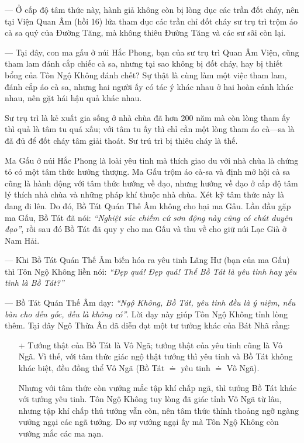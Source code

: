 --- Ở cấp độ tâm thức này, hành giả không còn bị lòng dục các trần đốt cháy, nên tại Viện Quan Âm (hồi 16) lửa tham dục các trần chỉ đốt cháy sư trụ trì trộm áo cà sa quý của Đường Tăng, mà không thiêu Đường Tăng và các sư sãi còn lại.

--- Tại đây, con ma gấu ở núi Hắc Phong, bạn của sư trụ trì Quan Âm Viện, cũng tham lam đánh cắp chiếc cà sa, nhưng tại sao không bị đốt cháy, hay bị thiết bổng của Tôn Ngộ Không đánh chết? Sự thật là cùng làm một việc tham lam, đánh cắp áo cà sa, nhưng hai người ấy có tác ý khác nhau ở hai hoàn cảnh khác nhau, nên gặt hái hậu quả khác nhau.

Sư trụ trì là kẻ xuất gia sống ở nhà chùa đã hơn 200 năm mà còn lòng tham ấy thì quả là tâm tu quá xấu; với tâm tu ấy thì chỉ cần một lòng tham áo cà---sa là đã đủ để đốt cháy tâm giải thoát. Sư trú trì bị thiêu cháy là thế.

Ma Gấu ở núi Hắc Phong là loài yêu tinh mà thích giao du với nhà chùa là chứng tỏ có một tâm thức hướng thượng. Ma Gấu trộm áo cà-sa và định mở hội cà sa cũng là hành động với tâm thức hướng về đạo, nhưng hướng về đạo ở cấp độ tâm lý thích nhà chùa và những pháp khí thuộc nhà chùa. Xét kỹ tâm thức này là đang đi lên. Do đó, Bồ Tát Quán Thế Âm không cho hại ma Gấu. Lần đầu gặp ma Gấu, Bồ Tát đã nói: \emph{``Nghiệt súc chiếm cứ sơn động này cũng có chút duyên đạo''}, rồi sau đó Bồ Tát đã quy y cho ma Gấu và thu về cho giữ núi Lạc Già ở Nam Hải.

--- Khi Bồ Tát Quán Thế Âm biến hóa ra yêu tinh Lăng Hư (bạn của ma Gấu) thì Tôn Ngộ Không liền nói: \emph{``Đẹp quá! Đẹp quá! Thế Bồ Tát là yêu tinh hay yêu tinh là Bồ Tát?''}

--- Bồ Tát Quán Thế Âm dạy: \emph{``Ngộ Không, Bồ Tát, yêu tinh đều là ý niệm, nếu bàn cho đến gốc, đều là không có''}. Lời dạy này giúp Tôn Ngộ Không tỉnh lòng thêm. Tại đây Ngô Thừa Ân đã diễn đạt một tư tưởng khác của Bát Nhã rằng:

\begin{enumerate}[label=\itshape\arabic*\upshape/]
    \item[+] Tướng thật của Bồ Tát là Vô Ngã; tướng thật của yêu tinh cũng là Vô Ngã. Vì thế, với tâm thức giác ngộ thật tướng thì yêu tinh và Bồ Tát không khác biệt, đều đồng thể Vô Ngã (Bồ Tát $\doteq$ yêu tinh $\doteq$ Vô Ngã).

    Nhưng với tâm thức còn vướng mắc tập khí chấp ngã, thì tướng Bồ Tát khác với tướng yêu tinh. Tôn Ngộ Không tuy lòng đã giác tỉnh Vô Ngã từ lâu, nhưng tập khí chấp thủ tướng vẫn còn, nên tâm thức thỉnh thoảng ngỡ ngàng vướng ngại các ngã tướng. Do sự vướng ngại ấy mà Tôn Ngộ Không còn vướng mắc các ma nạn.
\end{enumerate}

